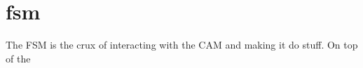 \section{fsm}
The FSM is the crux of interacting with the CAM and making it do stuff. On top of the 